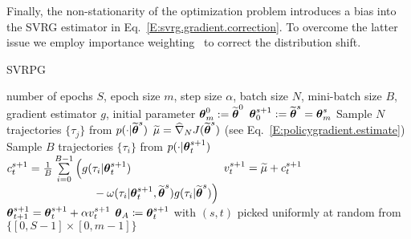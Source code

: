 Finally, the non-stationarity of the optimization problem introduces a bias into the \acs{SVRG} estimator in Eq.~\eqref{E:svrg.gradient.correction}.
To overcome the latter issue we employ importance weighting~\citep[\eg][]{rubinstein1981simulation,precup2000eligibility} to correct the distribution shift.


\begin{algorithm}[h]
	\caption{SVRPG}
	\label{alg:svrpg}
	\begin{algorithmic}[1]
		 number of epochs $S$, epoch size $m$, step size $\alpha$, batch size $N$, mini-batch size $B$, gradient estimator $g$, initial parameter $\vtheta_{m}^0 := \wt{\vtheta}^0$
		\STATE $\vtheta_0^{s+1} := \wt{\vtheta}^{s} = \vtheta_{m}^s$
		\STATE Sample $N$ trajectories $\{\tau_j\}$ from $p(\cdot\vert\wt{\vtheta}^{s})$
		\STATE $ \wt{\mu} = \gradApp{\wt{\vtheta}^{s}}{N}$ (see Eq.~\eqref{E:policygradient.estimate})%
		\STATE Sample $B$ trajectories $\{\tau_i\}$ from $p(\cdot\vert\vtheta_t^{s+1})$
		\STATE $c^{s+1}_t = \frac{1}{B} \sum\limits_{i=0}^{B-1}
		\begin{aligned}[t]
		\Big( & g(\tau_i|\vtheta_t^{s+1})\\ 
		& \quad{} - \omega(\tau_i|\vtheta^{s+1}_t, \wt{\vtheta}^s) g(\tau_i| \wt{\vtheta}^s) \Big)
		\end{aligned}$
		\STATE $v^{s+1}_t = \wt{\mu} + c^{s+1}_t$ %
		\STATE $\vtheta_{t+1}^{s+1} = \vtheta_t^{s+1} + \alpha v^{s+1}_t$
		\ENDFOR
		\ENDFOR
		 $\vtheta_A\coloneqq\vtheta_t^{s+1}$ with $(s,t)$ picked uniformly at random from $\{[0,S-1]\times[0,m-1]\}$
	\end{algorithmic}
\end{algorithm} 

